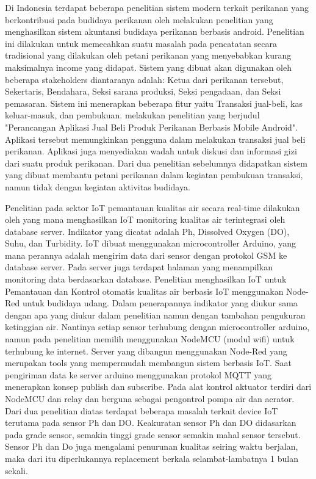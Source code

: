 Di Indonesia terdapat beberapa penelitian sistem modern terkait perikanan yang berkontribusi pada budidaya perikanan oleh \citep{supriyati2018sakemkm} melakukan penelitian yang menghasilkan sistem akuntansi budidaya perikanan berbasis android. Penelitian ini dilakukan untuk memecahkan suatu masalah pada pencatatan secara tradisional yang dilakukan oleh petani perikanan yang menyebabkan kurang maksimalnya income yang didapat. Sistem yang dibuat akan digunakan oleh beberapa stakeholders diantaranya adalah: Ketua dari perikanan tersebut, Sekertaris, Bendahara, Seksi sarana produksi, Seksi pengadaan, dan Seksi pemasaran. Sistem ini menerapkan beberapa fitur yaitu Transaksi jual-beli, kas keluar-masuk, dan pembukuan. \citep{Widhiastika2021foklik} melakukan penelitian yang berjudul "Perancangan Aplikasi Jual Beli Produk Perikanan Berbasis Mobile Android". Aplikasi tersebut memungkinkan pengguna dalam melakukan transaksi jual beli perikanan. Aplikasi juga menyediakan wadah untuk diskusi dan informasi gizi dari suatu produk perikanan. Dari dua penelitian sebelumnya didapatkan sistem yang dibuat membantu petani perikanan dalam kegiatan pembukuan transaksi, namun tidak dengan kegiatan aktivitas budidaya.

Penelitian pada sektor IoT pemantauan kualitas air secara real-time dilakukan oleh \citep{Yunior2019MonitoringKualitasAir} yang mana menghasilkan IoT monitoring kualitas air terintegrasi oleh database server. Indikator yang dicatat adalah Ph, Dissolved Oxygen (DO), Suhu, dan Turbidity. IoT dibuat menggunakan microcontroller Arduino, yang mana perannya adalah mengirim data dari sensor dengan protokol GSM ke database server. Pada server juga terdapat halaman yang menampilkan monitoring data berdasarkan database. Penelitian \citep{Rifai2021IoTNodeRed} menghasilkan IoT untuk Pemantauan dan Kontrol otomatis kualitas air berbasis IoT menggunakan Node-Red untuk budidaya udang. Dalam penerapannya indikator yang diukur sama dengan apa yang diukur dalam penelitian \citep{Yunior2019MonitoringKualitasAir} namun dengan tambahan pengukuran ketinggian air. Nantinya setiap sensor terhubung dengan microcontroller arduino, namun pada penelitian \citep{Rifai2021IoTNodeRed} memilih menggunakan NodeMCU (modul wifi) untuk terhubung ke internet. Server yang dibangun menggunakan Node-Red yang merupakan tools yang mempermudah membangun sistem berbasis IoT. Saat pengiriman data ke server arduino menggunakan protokol MQTT yang menerapkan konsep publish dan subscribe. Pada alat kontrol aktuator terdiri dari NodeMCU dan relay dan berguna sebagai pengontrol pompa air dan aerator. Dari dua penelitian diatas terdapat beberapa masalah terkait device IoT terutama pada sensor Ph dan DO. Keakuratan sensor Ph dan DO didasarkan pada grade sensor, semakin tinggi grade sensor semakin mahal sensor tersebut. Sensor Ph dan Do juga mengalami penurunan kualitas seiring waktu berjalan, maka dari itu diperlukannya replacement berkala selambat-lambatnya 1 bulan sekali.

